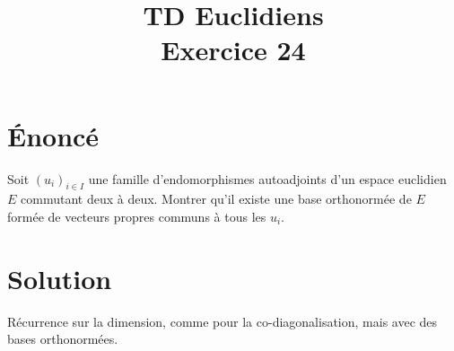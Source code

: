 \documentclass[french]{article}
\title{TD Euclidiens\\ Exercice 24}
\date{}
\begin{document}
\maketitle

\section{Énoncé}
Soit $(u_i)_{i\in I}$ une famille d'endomorphismes autoadjoints d'un espace euclidien $E$ commutant deux à deux. Montrer qu'il existe une base orthonormée de $E$ formée de vecteurs propres communs à tous les $u_i$.
\section{Solution}
Récurrence sur la dimension, comme pour la co-diagonalisation, mais avec des bases orthonormées.
\end{document}
